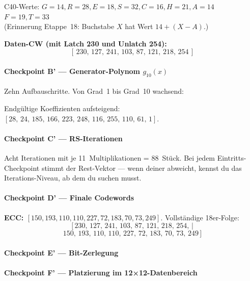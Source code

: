 C40-Werte: $G{=}14, R{=}28, E{=}18, S{=}32, C{=}16, H{=}21, A{=}14$ \\
\null\hspace{2em}$F{=}19, T{=}33$ \\
(Erinnerung Etappe~18: Buchstabe $X$ hat Wert $14 + (X-A)$.)

\textbf{Daten-CW (mit Latch 230 und Unlatch 254):}
\[ [\,230,\,127,\,241,\,103,\,87,\,121,\,218,\,254\,] \]

\paragraph{Checkpoint B' — Generator-Polynom $g_{10}(x)$}
Zehn Aufbauschritte. Von Grad~1 bis Grad~10 wachsend:



Endgültige Koeffizienten aufsteigend:
$[28,\,24,\,185,\,166,\,223,\,248,\,116,\,255,\,110,\,61,\,1]$.

\paragraph{Checkpoint C' — RS-Iterationen}
Acht Iterationen mit je 11~Multiplikationen = 88~Stück. Bei jedem
Eintritts-Checkpoint stimmt der Rest-Vektor — wenn deiner abweicht,
kennst du das Iterations-Niveau, ab dem du suchen musst.



\paragraph{Checkpoint D' — Finale Codewords}
\textbf{ECC: $[150, 193, 110, 110, 227, 72, 183, 70, 73, 249]$}.
Vollständige 18er-Folge:
\[
  [\,230,\,127,\,241,\,103,\,87,\,121,\,218,\,254,\,|
\]
\[
  150,\,193,\,110,\,110,\,227,\,72,\,183,\,70,\,73,\,249\,]
\]

\paragraph{Checkpoint E' — Bit-Zerlegung}



\paragraph{Checkpoint F' — Platzierung im 12×12-Datenbereich}

